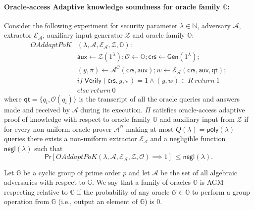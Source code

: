 \begin{definition}
\paragraph{Oracle-access Adaptive knowledge soundness for oracle family $\mathbb{O}$:} Consider the following experiment for security 
parameter $\lambda \in \mathbb{N}$, adversary $\mathcal{A}$, extractor $\mathcal{E}_{\mathcal{A}}$, auxiliary 
input generator $\mathcal{Z}$ and oracle family $\mathbb{O}$:\\
\begin{align*}
\mathit{OAddaptPoK}&(\lambda, \mathcal{A}, \mathcal{E}_{\mathcal{A}}, \mathcal{Z}, \mathbb{O}): \\
& \mathsf{aux} \leftarrow \mathcal{Z}(1^{\lambda}); \mathcal{O} \leftarrow \mathbb{O}; \mathsf{crs} \leftarrow \mathsf{Gen}(1^{\lambda}); \\
& (y,\pi) \leftarrow \mathcal{A}^{\mathcal{O}}(\mathsf{crs},\mathsf{aux}); w \leftarrow \mathcal{E}_{\mathcal{A}}(\mathsf{crs}, \mathsf{aux}, \mathsf{qt}); \\
& if \ \mathsf{Verify}(\mathsf{crs}, y, \pi) = 1 \wedge (y,w) \in R \ return  \ 1 \\
& else \ return \ 0
\end{align*}
\noindent where $\mathsf{qt} = \{q_i, \mathcal{O}(q_i)\}$ is the transcript of all the oracle queries and answers made and received by 
$\mathcal{A}$ during its execution. $\Pi$ satisfies oracle-access adaptive proof of knowledge with respect to oracle family  $\mathbb{O}$ and auxiliary 
input from $\mathcal{Z}$ if for every non-uniform oracle prover $\mathcal{A}^{\mathcal{O}}$  
making at most $Q(\lambda) = \mathsf{poly}(\lambda)$ queries there exists a non-uniform extractor $\mathcal{E}_{\mathcal{A}}$ 
and a negligible function $\mathsf{negl}(\lambda)$ such that 
$$\mathsf{Pr}[\mathit{OAddaptPoK}(\lambda, \mathcal{A}, \mathcal{E}_{\mathcal{A}}, \mathcal{Z}, \mathcal{O}) \implies  1]\ \leq \mathsf{negl}(\lambda).$$ 
\end{definition} 

\begin{definition}
\label{def:agm_oracles}
Let $\mathbb{G}$ be a cyclic group of prime order $p$ and let $\mathcal{A}$ be the set of all algebraic adversaries with 
respect to $\mathbb{G}$. We say that a family of oracles $\mathbb{O}$ is AGM respecting relative to $\mathbb{G}$ if 
the probability of any oracle $\mathcal{O} \in \mathbb{O}$ to perform a group operation from $\mathbb{G}$ 
(i.e., output an element of $\mathbb{G}$) is $0$. 
\end{definition}

